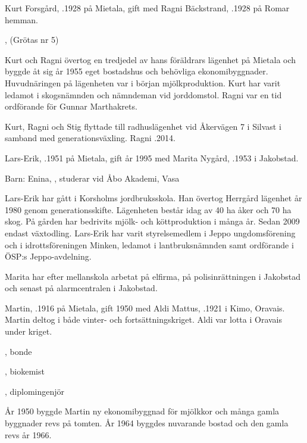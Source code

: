 Kurt Forsgård, .1928 på Mietala, gift med Ragni Bäckstrand, .1928 på Romar hemman.
\begin{jhchildren}
  \item {}, (Grötas nr 5)
  \item {}
\end{jhchildren}
Kurt och Ragni övertog en tredjedel av hans föräldrars lägenhet på Mietala och byggde åt sig år 1955 eget bostadshus och behövliga ekonomibyggnader. Huvudnäringen på lägenheten var i början mjölkproduktion. Kurt har varit ledamot i skogsnämnden och nämndeman vid jorddomstol. Ragni var en tid ordförande för Gunnar Marthakrets.

Kurt, Ragni och Stig flyttade till radhuslägenhet vid Åkervägen 7 i Silvast i samband med generationsväxling. Ragni .2014.




Lars-Erik, .1951 på Mietala, gift år 1995 med Marita Nygård, .1953 i Jakobstad.

Barn: Enina, , studerar vid Åbo Akademi, Vasa

Lars-Erik har gått i Korsholms jordbruksskola. Han övertog Herrgård	lägenhet år 1980 genom generationsskifte. Lägenheten består idag av 40 ha åker och 70 ha skog. På gården har bedrivits mjölk- och köttproduktion i många år. Sedan 2009 endast växtodling. Lars-Erik har varit styrelsemedlem i Jeppo ungdomsförening och i idrottsföreningen Minken, ledamot i lantbruksnämnden samt ordförande i ÖSP:s Jeppo-avdelning.

Marita har efter mellanskola arbetat på elfirma, på polisinrättningen i Jakobstad och senast på alarmcentralen i Jakobstad.


Martin, .1916 på Mietala, gift 1950 med Aldi  Mattus, .1921 i Kimo, Oravais. Martin deltog i både vinter- och fortsättningskriget. Aldi var lotta i Oravais under kriget.
\begin{jhchildren}
  \item {}, bonde
  \item {}, biokemist
  \item {}, diplomingenjör
\end{jhchildren}
År 1950 byggde Martin ny ekonomibyggnad för mjölkkor och många gamla byggnader revs på tomten. År 1964 byggdes nuvarande bostad och den gamla revs år 1966.

